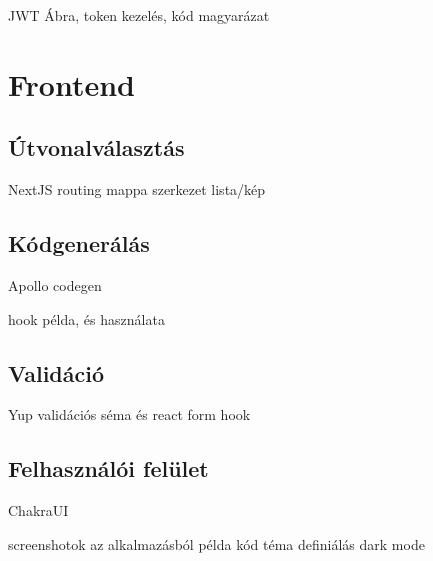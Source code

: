 JWT Ábra, token kezelés, kód magyarázat



\section{Frontend}


\subsection{Útvonalválasztás}
NextJS routing mappa szerkezet lista/kép

\subsection{Kódgenerálás}

Apollo codegen

hook példa, és használata


\subsection{Validáció}

Yup validációs séma és react form hook

\subsection{Felhasználói felület}
ChakraUI

screenshotok az alkalmazásból
példa kód
téma definiálás
dark mode

